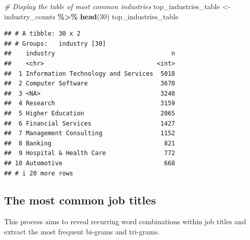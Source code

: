 \documentclass[11pt,]{article}
\newenvironment{Shaded}{\begin{snugshade}}{\end{snugshade}}
\newcommand{\CommentTok}[1]{\textcolor[rgb]{0.56,0.35,0.01}{\textit{#1}}}
\newcommand{\DecValTok}[1]{\textcolor[rgb]{0.00,0.00,0.81}{#1}}
\newcommand{\FunctionTok}[1]{\textcolor[rgb]{0.13,0.29,0.53}{\textbf{#1}}}
\newcommand{\NormalTok}[1]{#1}
\newcommand{\OtherTok}[1]{\textcolor[rgb]{0.56,0.35,0.01}{#1}}
\newcommand{\SpecialCharTok}[1]{\textcolor[rgb]{0.81,0.36,0.00}{\textbf{#1}}}
\begin{document}
\begin{Shaded}
\begin{Highlighting}[]
\CommentTok{\# Display the table of most common industries}
\NormalTok{top\_industries\_table }\OtherTok{\textless{}{-}}\NormalTok{ industry\_counts }\SpecialCharTok{\%\textgreater{}\%}
  \FunctionTok{head}\NormalTok{(}\DecValTok{30}\NormalTok{)}
\NormalTok{top\_industries\_table}
\end{Highlighting}
\end{Shaded}

\begin{verbatim}
## # A tibble: 30 x 2
## # Groups:   industry [30]
##    industry                                n
##    <chr>                               <int>
##  1 Information Technology and Services  5018
##  2 Computer Software                    3670
##  3 <NA>                                 3240
##  4 Research                             3159
##  5 Higher Education                     2065
##  6 Financial Services                   1427
##  7 Management Consulting                1152
##  8 Banking                               821
##  9 Hospital & Health Care                772
## 10 Automotive                            668
## # i 20 more rows
\end{verbatim}

\hypertarget{the-most-common-job-titles}{%
\subsection{The most common job
titles}\label{the-most-common-job-titles}}

This process aims to reveal recurring word combinations within job
titles and extract the most frequent bi-grams and tri-grams.
\end{document}
